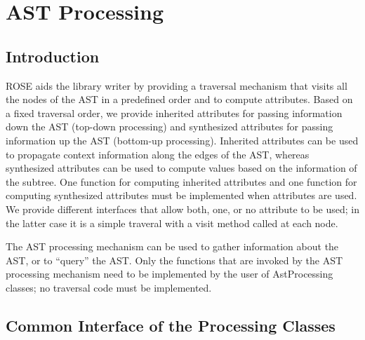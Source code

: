 
\chapter{AST Processing}
\label{AstProcessing:astProcessing}


\section{Introduction}
\label{AstProcessing:introduction}

ROSE aids the library writer by providing a traversal
mechanism that visits all the nodes of the AST in a predefined order
and to compute attributes.  Based on a fixed traversal order, we
provide inherited attributes for passing information down the AST (top-down processing) and synthesized attributes for passing information up
the AST (bottom-up processing). Inherited attributes can be used to
propagate context information along the edges of the AST, whereas
synthesized attributes can be used to compute values based on the
information of the subtree.  One function for computing inherited
attributes and one function for computing synthesized attributes must
be implemented when attributes are used.  We provide different
interfaces that allow both, one, or no attribute to be used; in
the latter case it is a simple traveral with a visit method called at
each node.

The AST processing mechanism can be used to gather information
about the AST, or to ``query'' the AST. Only the functions that are
invoked by the AST processing mechanism need to be implemented by the user
of AstProcessing classes; no traversal code must be implemented.

\section{Common Interface of the Processing Classes}

